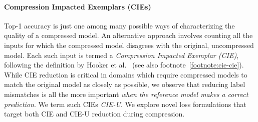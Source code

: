 \paragraph{Compression Impacted Exemplars (CIEs)}

Top-1 accuracy is just one among many possible ways of characterizing the quality of a compressed model. An alternative approach involves counting all the inputs for which the compressed model disagrees with the original, uncompressed model. Each such input is termed a {\em Compression Impacted Exemplar (CIE)}, following the definition by Hooker et al.~\cite{hooker2020characterising} (see also footnote~\ref{footnote:cie-cie}). %
While CIE reduction is critical in domains which require compressed models to match the original model as closely as possible,
we observe that reducing label mismatches is all the more important {\em when the reference model makes a correct prediction}. We term such CIEs {\em CIE-U}. We explore novel loss formulations that target both CIE and CIE-U reduction during compression.




